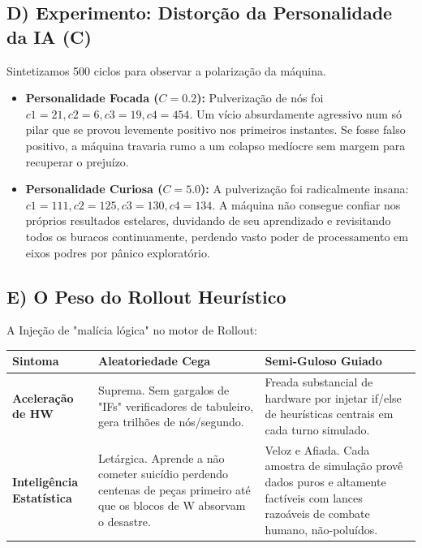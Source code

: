 \subsection*{D) Experimento: Distorção da Personalidade da IA (C)}

Sintetizamos 500 ciclos para observar a polarização da máquina.

\begin{itemize}
    \item \textbf{Personalidade Focada ($C=0.2$):} Pulverização de nós foi $c1=21, c2=6, c3=19, c4=454$. Um vício absurdamente agressivo num só pilar que se provou levemente positivo nos primeiros instantes. Se fosse falso positivo, a máquina travaria rumo a um colapso medíocre sem margem para recuperar o prejuízo.
    \item \textbf{Personalidade Curiosa ($C=5.0$):} A pulverização foi radicalmente insana: $c1=111, c2=125, c3=130, c4=134$. A máquina não consegue confiar nos próprios resultados estelares, duvidando de seu aprendizado e revisitando todos os buracos continuamente, perdendo vasto poder de processamento em eixos podres por pânico exploratório.
\end{itemize}

\subsection*{E) O Peso do Rollout Heurístico}

A Injeção de "malícia lógica" no motor de Rollout:

\begin{table}[H]
\centering
\begin{tabular}{|p{3cm}|p{6cm}|p{6cm}|}
\hline
\textbf{Sintoma} & \textbf{Aleatoriedade Cega} & \textbf{Semi-Guloso Guiado} \\ \hline
\textbf{Aceleração de HW} & Suprema. Sem gargalos de "IFs" verificadores de tabuleiro, gera trilhões de nós/segundo. & Freada substancial de hardware por injetar if/else de heurísticas centrais em cada turno simulado. \\ \hline
\textbf{Inteligência Estatística} & Letárgica. Aprende a não cometer suicídio perdendo centenas de peças primeiro até que os blocos de W absorvam o desastre. & Veloz e Afiada. Cada amostra de simulação provê dados puros e altamente factíveis com lances razoáveis de combate humano, não-poluídos. \\ \hline
\end{tabular}
\end{table}
